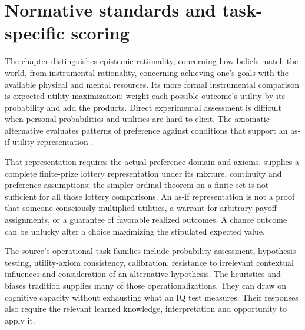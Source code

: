 \section{Normative standards and task-specific scoring}
\label{sec:p19-rat152-benchmarks}

The chapter distinguishes epistemic rationality, concerning how beliefs
match the world, from instrumental rationality, concerning achieving one's
goals with the available physical and mental resources. Its more formal
instrumental comparison is expected-utility maximization: weight each
possible outcome's utility by its probability and add the products.
Direct experimental assessment is difficult when personal probabilities
and utilities are hard to elicit. The axiomatic alternative evaluates
patterns of preference against conditions that support an as-if utility
representation \cite[p.~792]{StanovichToplakWest2021Intelligence}.

That representation requires the actual preference domain and axioms.
 supplies a complete finite-prize
lottery representation under its mixture, continuity and preference
assumptions; the simpler ordinal theorem on a finite set is not sufficient
for all those lottery comparisons. An as-if representation is not a proof
that someone consciously multiplied utilities, a warrant for arbitrary
payoff assignments, or a guarantee of favorable realized outcomes. A
chance outcome can be unlucky after a choice maximizing the stipulated
expected value.

The source's operational task families include probability assessment,
hypothesis testing, utility-axiom consistency, calibration, resistance
to irrelevant contextual influences and consideration of an alternative
hypothesis. The heuristics-and-biases tradition supplies many of those
operationalizations. They can draw on cognitive capacity without exhausting
what an IQ test measures. Their responses also require the relevant learned
knowledge, interpretation and opportunity to apply it.

